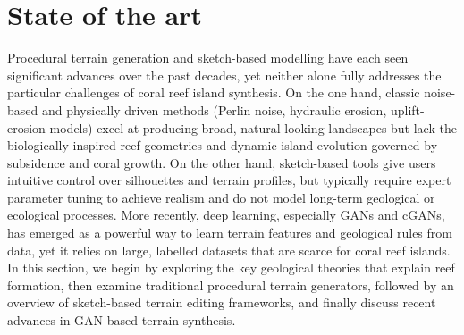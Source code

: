 






\section{State of the art}
\label{sec:coral-island-SotA}

Procedural terrain generation and sketch-based modelling have each seen significant advances over the past decades, yet neither alone fully addresses the particular challenges of coral reef island synthesis. On the one hand, classic noise-based and physically driven methods (Perlin noise, hydraulic erosion, uplift-erosion models) excel at producing broad, natural-looking landscapes but lack the biologically inspired reef geometries and dynamic island evolution governed by subsidence and coral growth. On the other hand, sketch-based tools give users intuitive control over silhouettes and terrain profiles, but typically require expert parameter tuning to achieve realism and do not model long-term geological or ecological processes. More recently, deep learning, especially GANs and cGANs, has emerged as a powerful way to learn terrain features and geological rules from data, yet it relies on large, labelled datasets that are scarce for coral reef islands. In this section, we begin by exploring the key geological theories that explain reef formation, then examine traditional procedural terrain generators, followed by an overview of sketch-based terrain editing frameworks, and finally discuss recent advances in GAN-based terrain synthesis.


